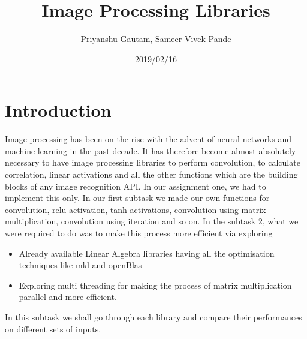 \documentclass[a4paper]{article}
\title{Image Processing Libraries}
\author{Priyanshu Gautam, Sameer Vivek Pande}
\date{2019/02/16}
\begin{document}
\maketitle

\section{Introduction}

Image processing has been on the rise with the advent of neural networks and machine learning in the past decade. It has therefore become almost absolutely necessary to have image processing libraries to perform convolution, to calculate correlation, linear activations and all the other functions which are the building blocks of any image recognition API.
In our assignment one, we had to implement this only. In our first subtask we made our own functions for convolution, relu activation, tanh activations, convolution using matrix multiplication, convolution using iteration and so on. In the subtask 2, what we were required to do was to make this process more efficient via exploring \begin{itemize}
\item Already available Linear Algebra libraries having all the optimisation techniques like mkl and openBlas
\item Exploring multi threading for making the process of matrix multiplication parallel and more efficient.
\end {itemize}

In this subtask we shall go through each library and compare their performances on different sets of inputs.

\end{document}
